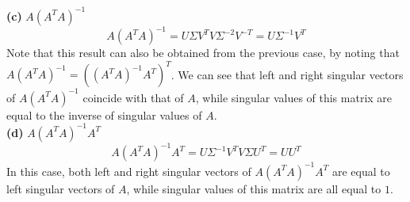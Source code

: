 \documentclass[a4paper,11pt]{article}
\begin{document}

\noindent \textbf{(c)} $A(A^{T}A)^{-1}$
\[A(A^{T}A)^{-1} = U\Sigma V^{T}V\Sigma^{-2}V^{-T}=U\Sigma^{-1}V^{T}\]
Note that this result can also be obtained from the previous case, by noting that $A(A^{T}A)^{-1}=((A^{T}A)^{-1}A^{T})^{T}$. We can see that left and right singular vectors of $A(A^{T}A)^{-1}$ coincide with that of $A$, while singular values of this matrix are equal to the inverse of singular values of $A$.\\

\noindent \textbf{(d)} $A(A^{T}A)^{-1}A^{T}$
\[A(A^{T}A)^{-1}A^{T} = U\Sigma^{-1}V^{T}V\Sigma U^{T}= U U^{T} \]
In this case, both left and right singular vectors of $A(A^{T}A)^{-1}A^{T}$ are equal to left singular vectors of $A$, while singular values of this matrix are all equal to $1$.\\
\end{document}
